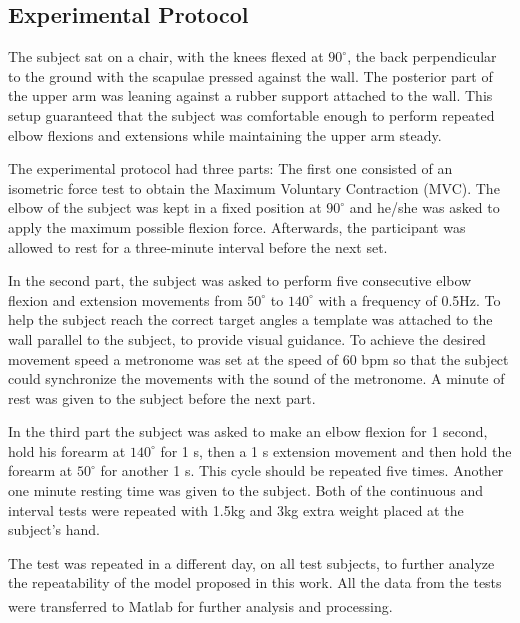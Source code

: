 \documentclass[letterpaper, 10 pt, conference]{ieeeconf}  %
\begin{document}
\subsection{Experimental Protocol}


The subject sat on a chair, with the knees flexed at \(90^{\circ}\), the back perpendicular to the ground with the scapulae pressed against the wall. The posterior part of the upper arm was leaning against a rubber support attached to the wall. This setup guaranteed that the subject was comfortable enough to perform repeated elbow flexions and extensions while maintaining the upper arm steady. 

The experimental protocol had three parts: The first one consisted of an isometric force test to obtain the Maximum Voluntary Contraction (MVC). The elbow of the subject was kept in a fixed position at \(90^{\circ}\) and he/she was asked to apply the maximum possible flexion force. Afterwards, the participant was allowed to rest for a three-minute interval before the next set.

In the second part, the subject was asked to perform five consecutive elbow flexion and extension movements from  \(50^{\circ}\) to \(140^{\circ}\) with a frequency of 0.5Hz. To help the subject reach the correct target angles a template was attached to the wall parallel to the subject, to provide visual guidance. To achieve the desired movement speed a metronome was set at the speed of 60 bpm so that the subject could synchronize the movements with the sound of the metronome. A minute of rest was given to the subject before the next part.

In the third part the subject was asked to make an elbow flexion for 1 second, hold his forearm at \(140^{\circ}\) for 1 s, then a 1 s extension movement and then hold the forearm at \(50^{\circ}\) for another 1 s. This cycle should be repeated five times. Another one minute resting time was given to the subject.
Both of the continuous and interval tests were repeated with 1.5kg and 3kg extra weight placed at the subject's hand.

The test was repeated in a different day, on all test subjects, to further analyze the repeatability of the model proposed in this work. All the data from the tests were transferred to Matlab\textsuperscript{\textregistered} for further analysis and processing.
\end{document}
